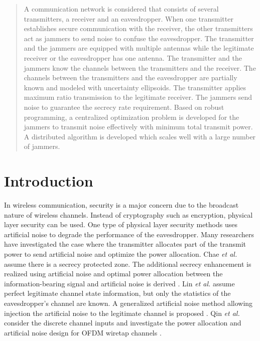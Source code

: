 \documentclass[conference]{IEEEtran}
\begin{document}
\begin{abstract}
A communication network is considered that consists of several transmitters, a receiver and an eavesdropper.  When one transmitter establishes secure communication with the receiver, the other transmitters act as jammers to send noise to confuse the eavesdropper.  The transmitter and the jammers are equipped with multiple antennas while the legitimate receiver or the eavesdropper has one antenna.  The transmitter and the jammers know the channels between the transmitters and the receiver. The channels between the transmitters and the eavesdropper are partially known and modeled with uncertainty ellipsoids.  The transmitter applies maximum ratio transmission to the legitimate receiver.  The jammers send noise to guarantee the secrecy rate requirement.  Based on robust programming, a centralized optimization problem is developed for the jammers to transmit noise effectively with minimum total transmit power.  A distributed algorithm is developed which scales well with a large number of jammers. 
\end{abstract}





%
\IEEEpeerreviewmaketitle



\section{Introduction}

In wireless communication, security is a major concern due to the broadcast nature of wireless channels. Instead of cryptography such as encryption, physical layer security can be used. One type of physical layer security methods uses artificial noise to degrade the performance of the eavesdropper. Many researchers have investigated the case where the transmitter allocates part of the transmit power to send artificial noise and optimize the power allocation. Chae \emph{et al.} assume there is a secrecy protected zone. The additional secrecy enhancement is realized using artificial noise and optimal power allocation between the information-bearing signal and artificial noise is derived \cite{chae2014enhanced}.  Lin \emph{et al.} assume perfect legitimate channel state information, but only the statistics of the eavesdropper's channel are known. A generalized artificial noise method allowing injection the artificial noise to the legitimate channel is proposed \cite{lin2013secrecy}. Qin \emph{et al.} consider the discrete channel inputs and investigate the power allocation and artificial noise design for OFDM wiretap channels \cite{qin2013power}.
\end{document}
